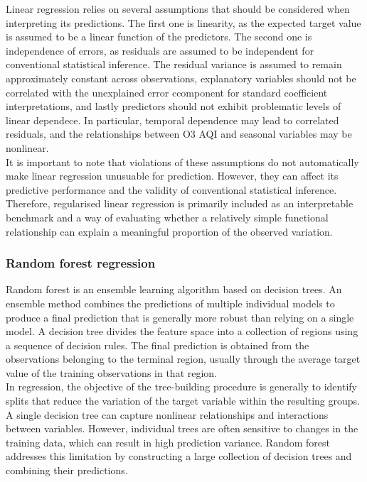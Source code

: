 \documentclass[11pt,a4paper]{article}
\begin{document}
\noindent
Linear regression relies on several assumptions that should be considered when interpreting its predictions. The first one is linearity, as the expected target value is assumed to be a linear function of the predictors. The second one is independence of errors, as residuals are assumed to be independent for conventional statistical inference. The residual variance is assumed to remain approximately constant across observations, explanatory variables should not be correlated with the unexplained error ccomponent for standard coefficient interpretations, and lastly predictors should not exhibit problematic levels of linear dependece. In particular, temporal dependence may lead to correlated residuals, and the relationships between O3 AQI and seasonal variables may be nonlinear.\\

\noindent
It is important to note that violations of these assumptions do not automatically make linear regression unusuable for prediction. However, they can affect its predictive performance and the validity of conventional statistical inference. Therefore, regularised linear regression is primarily included as an interpretable benchmark and a way of evaluating whether a relatively simple functional relationship can explain a meaningful proportion of the observed variation.

\subsubsection{Random forest regression}
Random forest is an ensemble learning algorithm based on decision trees. An ensemble method combines the predictions of multiple individual models to produce a final prediction that is generally more robust than relying on a single model. A decision tree divides the feature space into a collection of regions using a sequence of decision rules. The final prediction is obtained from the observations belonging to the terminal region, usually through the average target value of the training observations in that region.\\

\noindent
In regression, the objective of the tree-building procedure is generally to identify splits that reduce the variation of the target variable within the resulting groups. A single decision tree can capture nonlinear relationships and interactions between variables. However, individual trees are often sensitive to changes in the training data, which can result in high prediction variance. Random forest addresses this limitation by constructing a large collection of decision trees and combining their predictions.\\
\end{document}
